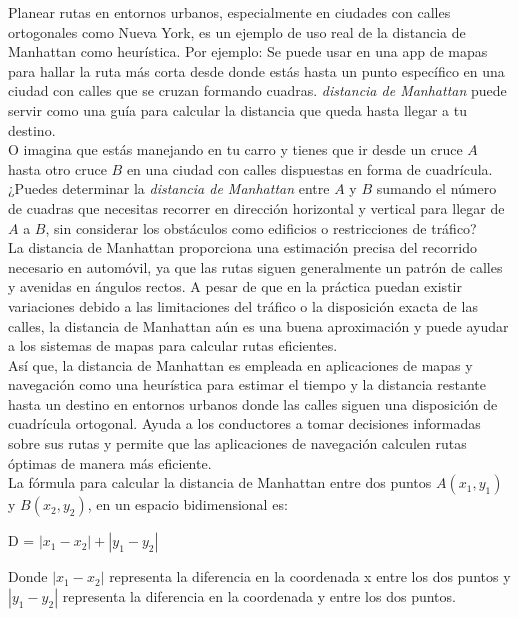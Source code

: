 Planear rutas en entornos urbanos, especialmente en ciudades con calles ortogonales como Nueva York,
es un ejemplo de uso real de la distancia de Manhattan como heurística. Por ejemplo: Se puede usar 
en una app de mapas para hallar la ruta más corta desde donde estás hasta un punto específico en 
una ciudad con calles que se cruzan formando cuadras. \textit{distancia de Manhattan} puede servir 
como una guía para calcular la distancia que queda hasta llegar a tu destino.\\ 


O imagina que estás manejando en tu carro y tienes que ir desde un cruce $A$ hasta otro cruce $B$ 
en una ciudad con calles dispuestas en forma de cuadrícula. ¿Puedes determinar la 
\textit{distancia de Manhattan} entre $A$ y $B$ sumando el número de cuadras que necesitas recorrer 
en dirección horizontal y vertical para llegar de $A$ a $B$, sin considerar los obstáculos como 
edificios o restricciones de tráfico?\\ 


La distancia de Manhattan proporciona una estimación precisa del recorrido necesario en automóvil,
ya que las rutas siguen generalmente un patrón de calles y avenidas en ángulos rectos. A pesar de
que en la práctica puedan existir variaciones debido a las limitaciones del tráfico o la disposición
exacta de las calles, la distancia de Manhattan aún es una buena aproximación y puede ayudar a los 
sistemas de mapas para calcular rutas eficientes. \\ 

Así que, la distancia de Manhattan es empleada en aplicaciones de mapas y navegación como una 
heurística para estimar el tiempo y la distancia restante hasta un destino en entornos urbanos 
donde las calles siguen una disposición de cuadrícula ortogonal. Ayuda a los conductores a tomar 
decisiones informadas sobre sus rutas y permite que las aplicaciones de navegación calculen rutas 
óptimas de manera más eficiente.\\ 


La fórmula para calcular la distancia de Manhattan entre dos puntos $A(x_1, y_1)$ y $B(x_2,y_2)$,
en un espacio bidimensional es:
\begin{center}
    D = $|x_1 - x_2| + |y_1 - y_2|$
\end{center}

Donde $|x_1 - x_2|$ representa la diferencia en la coordenada x entre los dos puntos y  
$|y_1 - y_2|$ representa la diferencia en la coordenada y entre los dos puntos.\\ 


